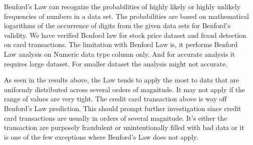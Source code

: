 Benford’s Law can recognize the probabilities of highly  
likely or highly unlikely frequencies of numbers in a data set.
The probabilities are based on mathematical logarithms of the 
occurrence of digits from the given data sets for Benford's 
validity. We have verified Benford law for stock price 
dataset and fraud detection on card transactions.
The limitation with Benford Law is, it performs 
Benford Law analysis on Numeric data type column only. 
And for accurate analysis it requires large dataset. 
For smaller dataset the analysis might not accurate.

As seen in the results above, the Law tends to 
apply the most to data that are uniformly 
distributed across several orders of magnitude. 
It may not apply if the range of values are 
very tight. The credit card transaction above 
is way off Benford’s Law prediction. 
This should prompt further investigation 
since credit card transactions are usually 
in orders of several magnitude. 
It’s either the transaction are purposely 
fraudulent or unintentionally filled 
with bad data or it is one of 
the few exceptions where Benford’s Law does not apply.



 
